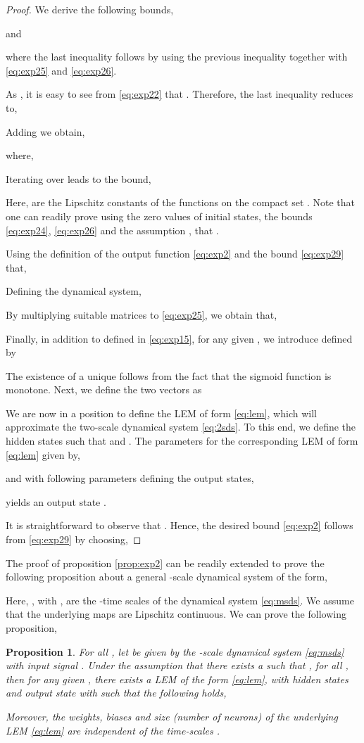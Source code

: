 \documentclass{article} \usepackage{iclr2022_conference,times}
\newtheorem{proposition}[theorem]{Proposition}
\begin{document}
\begin{proof}
We derive the following bounds,

and

where the last inequality follows by using the previous inequality together with \eqref{eq:exp25} and \eqref{eq:exp26}. 

As , it is easy to see from \eqref{eq:exp22} that . Therefore, the last inequality reduces to,

Adding we obtain,

where,


Iterating over  leads to the bound,

Here,  are the Lipschitz constants of the functions  on the compact set . Note that one can readily prove using the zero values of initial states, the bounds \eqref{eq:exp24}, \eqref{eq:exp26} and the assumption , that . 

Using the definition of the output function \eqref{eq:exp2} and the bound \eqref{eq:exp29} that, 

Defining the dynamical system,

By multiplying suitable matrices to \eqref{eq:exp25}, we obtain that,

Finally, in addition to  defined in \eqref{eq:exp15}, for any given , we introduce  defined by 

The existence of a unique  follows from the fact that the sigmoid function  is monotone. Next, we define the two vectors  as


We are now in a position to define the LEM of form \eqref{eq:lem}, which will approximate the two-scale dynamical system \eqref{eq:2sds}. To this end, we define the hidden states  such that  and . The parameters for the corresponding LEM of form \eqref{eq:lem} given by,

and with following parameters defining the output states,

yields an output state .  

It is straightforward to observe that . Hence, the desired bound \eqref{eq:exp2} follows from \eqref{eq:exp29} by choosing,


\end{proof}

The proof of proposition \ref{prop:exp2} can be readily extended to prove the following proposition about a general -scale dynamical system of the form, 

Here, , with , are the -time scales of the dynamical system \eqref{eq:msds}. We assume that the underlying maps  are Lipschitz continuous. We can prove the following proposition, 
\begin{proposition}
\label{prop:mts}
For all , let  be given by the -scale dynamical system \eqref{eq:msds} with input signal . Under the assumption that there exists a  such that , for all , then for any given , there exists a LEM of the form \eqref{eq:lem}, with hidden states  and output state  with  such that 
the following holds,

Moreover, the weights, biases and size (number of neurons) of the underlying LEM \eqref{eq:lem} are \emph{independent} of the time-scales .
\end{proposition}
\end{document}
